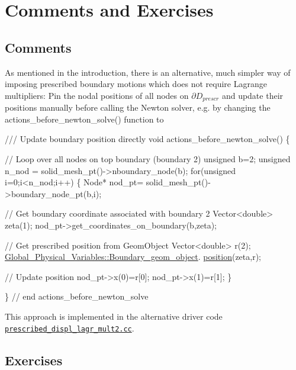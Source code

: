  

\hypertarget{index_comm_and_ex}{}\section{Comments and Exercises}\label{index_comm_and_ex}
\hypertarget{index_comm}{}\subsection{Comments}\label{index_comm}
As mentioned in the introduction, there is an alternative, much simpler way of imposing prescribed boundary motions which does not require Lagrange multipliers\+: Pin the nodal positions of all nodes on $ \partial D_{prescr} $ and update their positions manually before calling the Newton solver, e.\+g. by changing the {\ttfamily actions\+\_\+before\+\_\+newton\+\_\+solve()} function to

 
\begin{DoxyCodeInclude}
 \textcolor{comment}{/// Update boundary position directly}
 \textcolor{keywordtype}{void} actions\_before\_newton\_solve()
  \{

   \textcolor{comment}{// Loop over all nodes on top boundary (boundary 2)}
   \textcolor{keywordtype}{unsigned} b=2;
   \textcolor{keywordtype}{unsigned} n\_nod = solid\_mesh\_pt()->nboundary\_node(b);
   \textcolor{keywordflow}{for}(\textcolor{keywordtype}{unsigned} i=0;i<n\_nod;i++)
    \{
     Node* nod\_pt= solid\_mesh\_pt()->boundary\_node\_pt(b,i);

     \textcolor{comment}{// Get boundary coordinate associated with boundary 2}
     Vector<double> zeta(1);
     nod\_pt->get\_coordinates\_on\_boundary(b,zeta);

     \textcolor{comment}{// Get prescribed position from GeomObject}
     Vector<double> r(2);
     \hyperlink{namespaceGlobal__Physical__Variables_ab0a184463cbaaa353f2235411adef3c4}{Global\_Physical\_Variables::Boundary\_geom\_object}.
      \hyperlink{classWarpedLine_aaeef89818148ee3a305c561e91c8851d}{position}(zeta,r);

     \textcolor{comment}{// Update position}
     nod\_pt->x(0)=r[0];
     nod\_pt->x(1)=r[1];
    \}

  \} \textcolor{comment}{// end actions\_before\_newton\_solve}

\end{DoxyCodeInclude}


This approach is implemented in the alternative driver code \href{../../../../demo_drivers/solid/prescribed_displ_lagr_mult/prescribed_displ_lagr_mult2.cc}{\tt prescribed\+\_\+displ\+\_\+lagr\+\_\+mult2.\+cc}.\hypertarget{index_ex}{}\subsection{Exercises}\label{index_ex}

